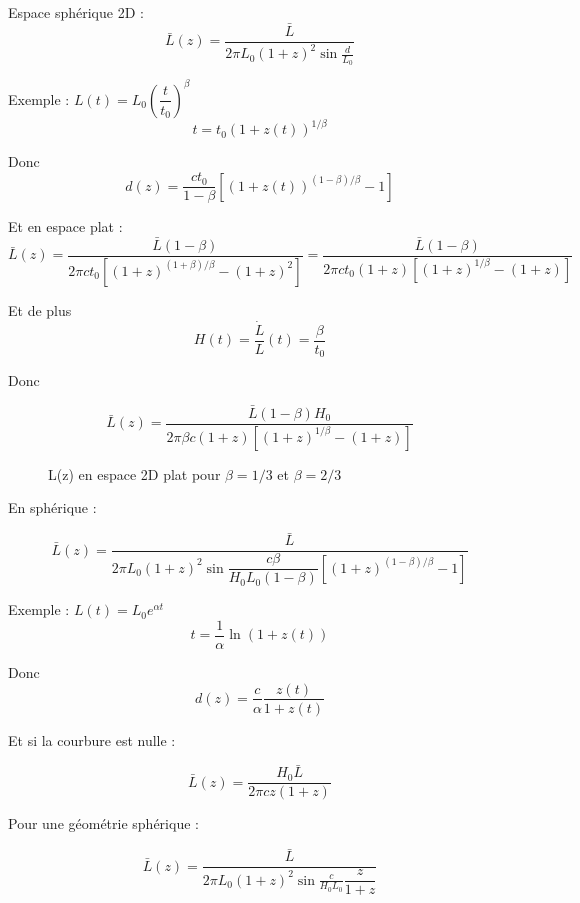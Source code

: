 \documentclass[11pt]{article} %
\begin{document}
Espace sphérique 2D : 
\begin{equation}
\bar{L} (z) = \dfrac{\bar{L}}{2\pi L_0(1+z)^2 \sin\frac{d}{L_0}}
\end{equation}

Exemple : $L(t) = L_0 \left (\dfrac{t}{t_0} \right )  ^\beta$
\begin{equation}
t = t_0 \left (1+z(t) \right)^{1/\beta}
\end{equation}

Donc
\begin{equation}
d(z) = \dfrac{ct_0} {1-\beta} \left [ \left (1+z(t) \right)^{(1-\beta)/\beta} - 1 \right ]
\end{equation}

Et en espace plat :
\begin{equation}
\bar{L} (z) = \dfrac{\bar{L}(1-\beta)}{2\pi ct_0 \left [ (1+z)^{(1+\beta)/\beta}- (1+z)^2 \right ] } = \dfrac{\bar{L}(1-\beta)}{2\pi ct_0 \left(1+z \right ) \left [ (1+z)^{1/\beta}- (1+z) \right ] }
\end{equation}

Et de plus 
\begin{equation}
H(t) = \dfrac{\dot{L}}{L}(t) = \dfrac{\beta}{t_0}
\end{equation}

Donc 


\begin{equation}
\bar{L} (z) = \dfrac{\bar{L}(1-\beta)H_0}{2\pi \beta c\left(1+z \right ) \left [ (1+z)^{1/\beta}- (1+z) \right ] }
\end{equation}


\begin{figure}[H]
\centering
  \caption{L(z) en espace 2D plat pour $\beta = 1/3$ et $\beta = 2/3$}
%

\end{figure}


En sphérique :

\begin{equation}
\bar{L} (z) = \dfrac{\bar{L}}{2\pi L_0 (1+z)^2 \sin\dfrac{c\beta} {H_0 L_0(1-\beta)} \left [ \left (1+z \right)^{(1-\beta)/\beta} - 1 \right ]}
\end{equation}

Exemple : $L(t) = L_0 e^{\alpha t}$
\begin{equation}
t = \dfrac{1}{\alpha} \ln {\left (1+z(t) \right )}
\end{equation}

Donc
\begin{equation}
d(z) = \dfrac{c}{\alpha} \dfrac{z(t)}{1+z(t)}
\end{equation}

Et si la courbure est nulle :

\begin{equation}
\bar{L} (z) = \dfrac{H_0 \bar{L}}{2\pi c z(1+z) }
\end{equation}

Pour une géométrie sphérique :

\begin{equation}
\bar{L} (z) = \dfrac{\bar{L}}{2\pi L_0(1+z)^2 \sin\frac{c}{H_0 L_0} \dfrac{z}{1+z}}
\end{equation}
\end{document}
